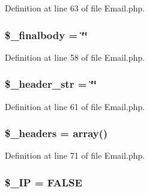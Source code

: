 Definition at line 63 of file Email.\-php.

\hypertarget{class_c_i___email_afe3b263ee6d58805f3c06ef1fdc863a5}{
\subsubsection[{\$\-\_\-finalbody}]{\setlength{\rightskip}{0pt plus 5cm}\$\-\_\-finalbody = \char`\"{}\char`\"{}}}\label{class_c_i___email_afe3b263ee6d58805f3c06ef1fdc863a5}


Definition at line 58 of file Email.\-php.

\hypertarget{class_c_i___email_a551b64b005666b98b001ed7ff405047c}{
\subsubsection[{\$\-\_\-header\-\_\-str}]{\setlength{\rightskip}{0pt plus 5cm}\$\-\_\-header\-\_\-str = \char`\"{}\char`\"{}}}\label{class_c_i___email_a551b64b005666b98b001ed7ff405047c}


Definition at line 61 of file Email.\-php.

\hypertarget{class_c_i___email_a1481ae63a7fb295087c3a668a0359500}{
\subsubsection[{\$\-\_\-headers}]{\setlength{\rightskip}{0pt plus 5cm}\$\-\_\-headers = array()}}\label{class_c_i___email_a1481ae63a7fb295087c3a668a0359500}


Definition at line 71 of file Email.\-php.

\hypertarget{class_c_i___email_ab476361e2d82b932d0ab83d516741b37}{
\subsubsection[{\$\-\_\-\-I\-P}]{\setlength{\rightskip}{0pt plus 5cm}\$\-\_\-\-I\-P = F\-A\-L\-S\-E}}\label{class_c_i___email_ab476361e2d82b932d0ab83d516741b37}


